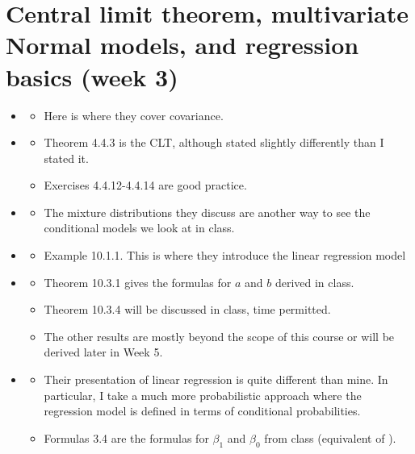 \section*{Central limit theorem, multivariate Normal models, and regression basics (week 3)}
\begin{itemize}
\item \cite[Section 3.3]{tabak}
\begin{itemize}
\item Here is where they cover covariance. 
\end{itemize}
\item \cite[Section 4.4.1]{tabak}
\begin{itemize}
\item Theorem 4.4.3 is the CLT, although stated slightly differently than I stated it. 
\item Exercises 4.4.12-4.4.14 are good practice. 
\end{itemize}
\item \cite[Section 2.5.4]{tabak}  
\begin{itemize}
\item The mixture distributions they discuss are another way to see the conditional models we look at in class. 
\end{itemize}
\item \cite[Section 10.1]{tabak}  
\begin{itemize}
\item Example 10.1.1. This is where they introduce the linear regression model
\end{itemize}
\item \cite[Section 10.3]{tabak}  
\begin{itemize}
\item Theorem 10.3.1 gives the formulas for $a$ and $b$ derived in class. 
\item Theorem 10.3.4 will be discussed in class, time permitted. 
\item The other results are mostly beyond the scope of this course or will be derived later in Week 5. 
\end{itemize}
\item  \cite[Section 3.1.1]{islp}
\begin{itemize}
\item Their presentation of linear regression is quite different than mine. In particular, I take a much more probabilistic approach where the regression model is defined in terms of conditional probabilities. 
\item Formulas 3.4 are the formulas for $\beta_1$ and $\beta_0$ from class (equivalent of \cite[Theorem 10.3.1]{tabak}).
\end{itemize}
\end{itemize}
